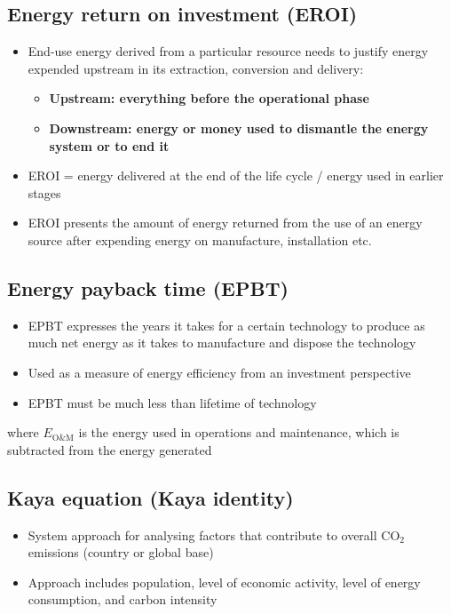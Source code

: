 \documentclass{article}
\begin{document}
\subsection{Energy return on investment (EROI)}
\begin{itemize}
    \item End-use energy derived from a particular resource needs to justify energy expended upstream in its extraction, conversion and delivery:
    \begin{itemize}
        \item \textbf{Upstream: everything before the operational phase}
        \item \textbf{Downstream: energy or money used to dismantle the energy system or to end it}
    \end{itemize}
    \item EROI = energy delivered at the end of the life cycle / energy used in earlier stages
    \item EROI presents the amount of energy returned from the use of an energy source after expending energy on manufacture, installation etc.
\end{itemize}

\subsection{Energy payback time (EPBT)}
\begin{itemize}
    \item EPBT expresses the years it takes for a certain technology to produce as much net energy as it takes to manufacture and dispose the technology
    \item Used as a measure of energy efficiency from an investment perspective
    \item EPBT must be much less than lifetime of technology
\end{itemize}


where $E_\text{O\&M}$ is the energy used in operations and maintenance, which is subtracted from the energy generated


\subsection{Kaya equation (Kaya identity)}
\begin{itemize}
    \item System approach for analysing factors that contribute to overall CO$_2$ emissions (country or global base)
    \item Approach includes population, level of economic activity, level of energy consumption, and carbon intensity
\end{itemize}
\end{document}

